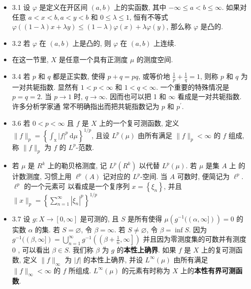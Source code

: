 \begin{itemize}
\item 3.1 设 $\varphi$ 是定义在开区间 $(a, b)$ 上的实函数, 其中 $-\infty \leqslant a<b \leqslant \infty$. 如果对任意 $a<x<b, a<y<b$ 和 $0 \leqslant \lambda \leqslant 1$, 恒有不等式 $\varphi((1-\lambda) x+\lambda y) \leqslant(1-\lambda) \varphi(x)+\lambda \varphi(y)$, 那么称 $\varphi$ 是凸的.

\item 3.2 若 $\varphi$ 在 $(a, b)$ 上是凸的, 则 $\varphi$ 在 $(a, b)$ 上连续.

\item 在这一节里, $X$ 是任意一个具有正测度 $\mu$ 的测度空间.

\item 3.4 若 $p$ 和 $q$ 都是正实数, 使得 $p+q=p q$, 或等价地 $\frac{1}{p}+\frac{1}{q}=1$, 则称 $p$ 和 $q$ 为一对共轭指数. 显然有 $1<p<\infty$ 和 $1<q<\infty$. 一个重要的特殊情况是 $p=q=2$. 当 $p \rightarrow 1$ 时, $q \rightarrow \infty$. 因而也可以把 1 和 $\infty$ 看成是一对共轭指数. 许多分析学家通 常不明确指出而把共轭指数记为 $p$ 和 $p^{\prime}$.

\item 3.6 若 $0<p<\infty$ 且 $f$ 是 $X$ 上的一个复可测函数, 定义 $\|f\|_{p}=\left\{\int_{\mathrm{x}}|f|^{p} \mathrm{~d} \mu\right\}^{1 / p}$, 且设 $L^{p}(\mu)$ 由所有满足 $\|f\|_{p}<\infty$ 的 $f$ 组成, 称 $\|f\|_{p}$ 为 $f$ 的 $L^{p}$-范数.

\item 若 $\mu$ 是 $R^{k}$ 上的勒贝格测度, 记 $L^{p}\left(R^{k}\right)$ 以代替 $L^{p}(\mu)$. 若 $\mu$ 是集 $A$ 上 的计数测度, 习惯上用 $\ell^{p}(A)$ 记对应的 $L^{p}$-空间. 当 $A$ 可数时, 便简记为 $\ell^{p}$. $\ell^{p}$ 的一个元素可 以看成是一个复序列 $x=\left\{\xi_{n}\right\}$, 并且 $\|x\|_{p}=\left\{\sum_{n=1}^{\infty}\left|\xi_{n}\right|^{p}\right\}^{1 / p}$

\item 3.7 设 $g: X \rightarrow[0, \infty]$ 是可测的, 且 $S$ 是所有使得 $\mu\left(g^{-1}((\alpha, \infty])\right)=0$ 的实数 $\alpha$ 的集. 若 $S=\varnothing$, 令 $\beta=\infty$. 若 $S \neq \varnothing$, 令 $\beta=\inf S$. 因为 $g^{-1}((\beta, \infty])=\bigcup_{n=1}^{\infty} g^{-1}\left(\left(\beta+\frac{1}{n}, \infty\right]\right)$ 并且因为零测度集的可数并有测度 0 , 可以看出 $\beta \in S$. 我们称 $\beta$ 为 $g$ 的\textbf{本性上确界}. 如果 $f$ 是 $X$ 上的复可测函数, 定义 $\|f\|_{\infty}$ 为 $|f|$ 的本性上确界, 并设 $L^{\infty}(\mu)$ 由所有满足 $\|f\|_{\infty}<\infty$ 的 $f$ 所组成. $L^{\infty}(\mu)$ 的元素有时称为 $X$ 上的\textbf{本性有界可测函数}.


\end{itemize}
